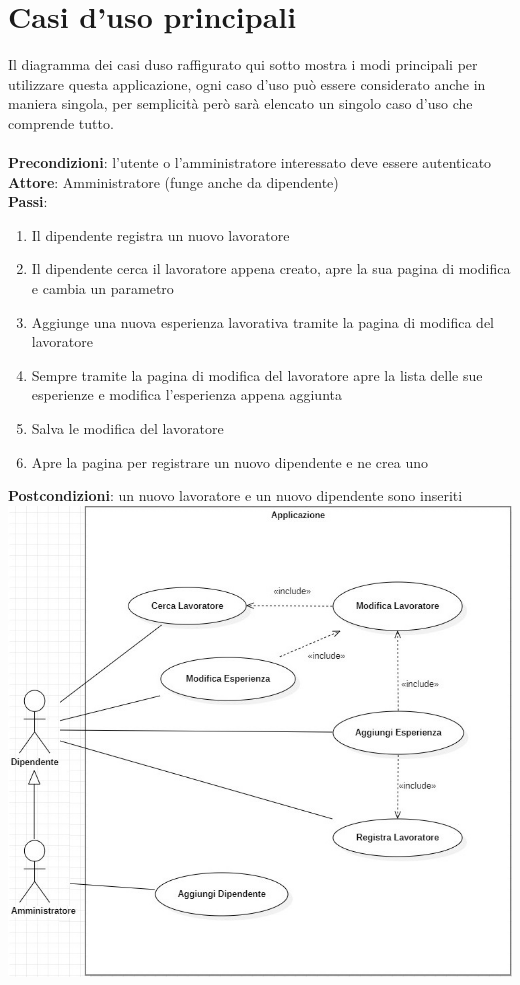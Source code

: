 \documentclass[ 4paper,11pt,openany]{book}
\begin{document}
\section{Casi d'uso principali}
Il diagramma dei casi duso raffigurato qui sotto mostra i modi principali per utilizzare questa applicazione, ogni caso d'uso può essere considerato anche in maniera singola, per semplicità però sarà elencato un singolo caso d'uso che comprende tutto.\\\\
\textbf{Precondizioni}: l'utente o l'amministratore interessato deve essere autenticato\\
\textbf{Attore}: Amministratore (funge anche da dipendente)\\
\textbf{Passi}:
\begin{enumerate}
\item Il dipendente registra un nuovo lavoratore
\item Il dipendente cerca il lavoratore appena creato, apre la sua pagina di modifica e cambia un parametro 
\item Aggiunge una nuova esperienza lavorativa tramite la pagina di modifica del lavoratore
\item Sempre tramite la pagina di modifica del lavoratore apre la lista delle sue esperienze e modifica l'esperienza appena aggiunta
\item Salva le modifica del lavoratore
\item Apre la pagina per registrare un nuovo dipendente e ne crea uno
\end{enumerate}
\textbf{Postcondizioni}: un nuovo lavoratore e un nuovo dipendente sono inseriti\\

\includegraphics[width=180mm]{casi.jpg}
\end{document}
